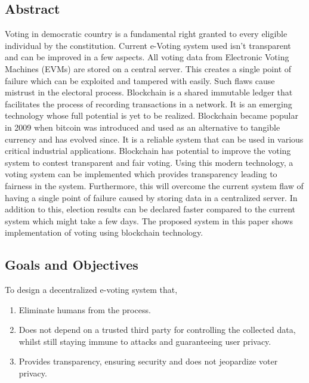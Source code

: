 \documentclass[oneside, 12pt]{book}
\begin{document}
		\subsection{Abstract}
			Voting in democratic country is a fundamental right granted to every eligible individual by the constitution. Current e-Voting system used isn’t transparent and can be improved in a few aspects. All voting data from Electronic Voting Machines (EVMs) are stored on a central server. This creates a single point of failure which can be exploited and tampered with easily. Such flaws cause mistrust in the electoral process. Blockchain is a shared  immutable ledger that facilitates the process of recording transactions in a network. It is an emerging technology whose full potential is yet to be realized. Blockchain became popular in 2009 when bitcoin was introduced and used as an alternative to tangible currency and has evolved since. It is a reliable system that can be used in various critical industrial applications. Blockchain has potential to improve the voting system to contest transparent and fair voting. Using this modern technology, a voting system can be implemented which provides transparency leading to fairness in the system. Furthermore, this will overcome the current system flaw of having a single point of failure caused by storing data in a centralized server. In addition to this, election results can be declared faster compared to the current system which might take a few days. The proposed system in this paper shows implementation of voting using blockchain technology.
		\subsection{Goals and Objectives}
			To design a decentralized e-voting system that,
			\begin{enumerate}
				\item Eliminate humans from the process.
				\item Does not depend on a trusted third party for controlling the collected data, whilst still staying immune to attacks and guaranteeing user privacy.
				\item Provides transparency, ensuring security and does not jeopardize voter privacy.
			\end{enumerate}
\end{document}
